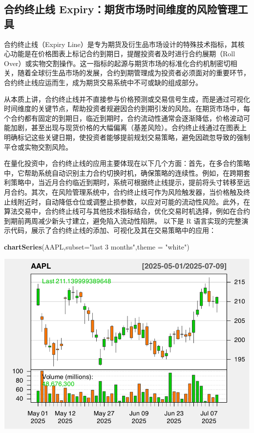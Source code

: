 \documentclass[]{ctexbook}
\newenvironment{Shaded}{\begin{snugshade}}{\end{snugshade}}
\newcommand{\AttributeTok}[1]{\textcolor[rgb]{0.13,0.29,0.53}{#1}}
\newcommand{\FunctionTok}[1]{\textcolor[rgb]{0.13,0.29,0.53}{\textbf{#1}}}
\newcommand{\NormalTok}[1]{#1}
\newcommand{\StringTok}[1]{\textcolor[rgb]{0.31,0.60,0.02}{#1}}
\begin{document}
\subsection{合约终止线 Expiry：期货市场时间维度的风险管理工具}\label{ux5408ux7ea6ux7ec8ux6b62ux7ebf-expiryux671fux8d27ux5e02ux573aux65f6ux95f4ux7ef4ux5ea6ux7684ux98ceux9669ux7ba1ux7406ux5de5ux5177}

合约终止线（Expiry Line）是专为期货及衍生品市场设计的特殊技术指标，其核心功能是在价格图表上标记合约到期日，提醒投资者及时进行合约展期（Roll Over）或实物交割操作。这一指标的起源与期货市场的标准化合约机制密切相关，随着全球衍生品市场的发展，合约到期管理成为投资者必须面对的重要环节，合约终止线应运而生，成为期货交易系统中不可或缺的组成部分。

从本质上讲，合约终止线并不直接参与价格预测或交易信号生成，而是通过可视化时间维度的关键节点，帮助投资者规避因合约到期引发的风险。在期货市场中，每个合约都有固定的到期日，临近到期时，合约流动性通常会逐渐降低，价格波动可能加剧，甚至出现与现货价格的大幅偏离（基差风险）。合约终止线通过在图表上明确标记这些关键日期，使投资者能够提前规划交易策略，避免因疏忽导致的强制平仓或实物交割风险。

在量化投资中，合约终止线的应用主要体现在以下几个方面：首先，在多合约策略中，它帮助系统自动识别主力合约切换时机，确保策略的连续性。例如，在跨期套利策略中，当近月合约临近到期时，系统可根据终止线提示，提前将头寸转移至远月合约。其次，在风险管理系统中，合约终止线可作为风险触发器，当价格触及终止线附近时，自动降低仓位或调整止损参数，以应对可能的流动性风险。此外，在算法交易中，合约终止线可与其他技术指标结合，优化交易时机选择，例如在合约到期前两周减少新头寸建立，避免陷入流动性陷阱。
以下是 R 语言实现的完整演示代码，展示了合约终止线的添加、可视化及其在交易策略中的应用：

\begin{Shaded}
\begin{Highlighting}[]
\FunctionTok{chartSeries}\NormalTok{(AAPL,}\AttributeTok{subset=}\StringTok{"last 3 months"}\NormalTok{,}\AttributeTok{theme =} \StringTok{"white"}\NormalTok{)}
\end{Highlighting}
\end{Shaded}

\includegraphics[width=0.9\linewidth]{quantmod_files/figure-latex/expiry_ex-1}
\end{document}
